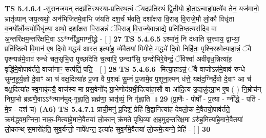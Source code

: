 \documentclass[17pt]{extarticle}
\begin{document}
                  \newline
                                \textbf{ TS 5.4.6.4} \newline
                  -सु॑रानजय॒न् तदप्र॑तिरथस्या-प्रतिरथ॒त्वं ॅयदप्र॑तिरथं द्वि॒तीयो॒ होता॒ऽन्वाहा᳚प्र॒त्ये॑व तेन॒ यज॑मानो॒ भ्रातृ॑व्यान् जय॒त्यथो॒ अन॑भिजितमे॒वाभि ज॑यति दश॒र्चं भ॑वति॒ दशा᳚क्षरा वि॒राड् वि॒राजे॒मौ लो॒कौ विधृ॑ता व॒नयो᳚र्लो॒कयो॒र्विधृ॑त्या॒ अथो॒ दशा᳚क्षरा वि॒राडन्नं॑ ॅवि॒राड् वि॒राज्ये॒वान्नाद्ये॒ प्रति॑तिष्ठ॒त्यस॑दिव॒ वा अ॒न्तरि॑क्षम॒न्तरि॑क्षमि॒वा ऽऽ*ग्नी᳚द्ध्र॒माग्नी॒द्ध्रे - [  ] \textbf{  27} \newline
                  \newline
                                \textbf{ TS 5.4.6.5} \newline
                  ऽश्मा॑नं॒ नि द॑धाति स॒त्त्वाय॒ द्वाभ्यां॒ प्रति॑ष्ठित्यै वि॒मान॑ ए॒ष दि॒वो मद्ध्य॑ आस्त॒ इत्या॑ह॒ व्ये॑वैतया॑ मिमीते॒ मद्ध्ये॑ दि॒वो निहि॑तः॒ पृश्नि॒रश्मेत्या॒हान्नं॒ ॅवै पृश्न्यन्न॑मे॒वाव॑ रुन्धे चत॒सृभि॒रा पुच्छा॑देति च॒त्वारि॒ छन्दाꣳ॑सि॒ छन्दो॑भिरे॒वेन्द्रं॒ ॅविश्वा॑ अवीवृध॒न्नित्या॑ह॒ वृद्धि॑मे॒वोपाव॑र्तते॒ वाजा॑नाꣳ॒॒ सत्प॑तिं॒ पति॒ - [  ] \textbf{  28} \newline
                  \newline
                                \textbf{ TS 5.4.6.6} \newline
                  -मित्या॒हाऽन्नं॒ ॅवै वाजोऽन्न॑मे॒वाव॑ रुन्धे सुम्न॒हूर्य॒ज्ञो दे॒वाꣳ आ च॑ वक्ष॒दित्या॑ह प्र॒जा वै प॒शवः॑ सु॒म्नं प्र॒जामे॒व प॒शूना॒त्मन् ध॑त्ते॒ यक्ष॑द॒ग्निर्दे॒वो दे॒वाꣳ आ च॑ वक्ष॒दित्या॑ह स्व॒गाकृ॑त्यै॒ वाज॑स्य मा प्रस॒वेनो᳚द्-ग्रा॒भेणोद॑ग्रभी॒दित्या॑हा॒सौ वा आ॑दि॒त्य उ॒द्यन्नु॑द्ग्रा॒भ ए॒ष ( ) नि॒म्रोच॑न् निग्रा॒भो ब्रह्म॑णै॒वाऽऽ*त्मान॑मुद्-गृ॒ह्णाति॒ ब्रह्म॑णा॒ भ्रातृ॑व्यं॒ नि गृ॑ह्णाति ॥ \textbf{  29 } \newline
                  \newline
                      (प्रा॒णैः - पोषो᳚ - प्र॒त्या - ग्नी᳚द्धे॒ - पति॑ - मे॒ष - दश॑ च)  \textbf{(A6)} \newline \newline
                                        \textbf{ TS 5.4.7.1} \newline
                  प्राची॒मनु॑ प्र॒दिशं॒ प्रेहि॑ वि॒द्वानित्या॑ह देवलो॒क-मे॒वैतयो॒पाव॑र्तते॒ क्रम॑द्ध्वम॒ग्निना॒ नाक॒-मित्या॑हे॒माने॒वैतया॑ लो॒कान् क्र॑मते पृथि॒व्या अ॒हमुद॒न्तरि॑क्ष॒मा ऽरु॑ह॒मित्या॑हे॒माने॒वैतया॑ लो॒कान्थ् स॒मारो॑हति॒ सुव॒र्यन्तो॒ नापे᳚क्षन्त॒ इत्या॑ह सुव॒र्गमे॒वैतया॑ लो॒कमे॒त्यग्ने॒ प्रेहि॑ - [  ] \textbf{  30} \newline
\end{document}
